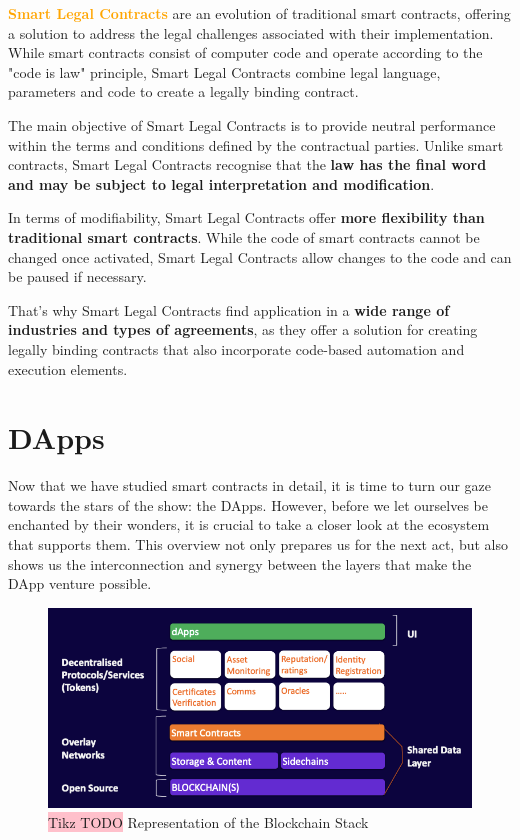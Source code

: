 \textbf{\textcolor{Orange}{Smart Legal Contracts}} are an evolution of traditional smart contracts, offering a solution to address the legal challenges associated with their implementation. While smart contracts consist of computer code and operate according to the "code is law" principle, Smart Legal Contracts combine legal language, parameters and code to create a legally binding contract.

The main objective of Smart Legal Contracts is to provide neutral performance within the terms and conditions defined by the contractual parties. Unlike smart contracts, Smart Legal Contracts recognise that the \textbf{law has the final word and may be subject to legal interpretation and modification}.

In terms of modifiability, Smart Legal Contracts offer \textbf{more flexibility than traditional smart contracts}. While the code of smart contracts cannot be changed once activated, Smart Legal Contracts allow changes to the code and can be paused if necessary.

That's why Smart Legal Contracts find application in a \textbf{wide range of industries and types of agreements}, as they offer a solution for creating legally binding contracts that also incorporate code-based automation and execution elements.

\section{DApps}

Now that we have studied smart contracts in detail, it is time to turn our gaze towards the stars of the show: the DApps. However, before we let ourselves be enchanted by their wonders, it is crucial to take a closer look at the ecosystem that supports them. This overview not only prepares us for the next act, but also shows us the interconnection and synergy between the layers that make the DApp venture possible. 

\begin{figure}[!htbp]
\centering\includegraphics[scale=0.75]{tikz/chapter 4 - Blockchain Stack.png}
\caption{{\color{red}\colorbox{pink}{Tikz TODO}} Representation of the Blockchain Stack}
\end{figure}

